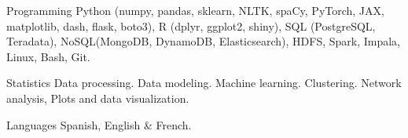 


\begin{cvskills}


\cvskill
{Programming} %
{Python (numpy, pandas, sklearn, NLTK, spaCy, PyTorch, JAX, matplotlib, dash, flask, boto3), R (dplyr, ggplot2, shiny),} %
\cvskill
{}
{SQL (PostgreSQL, Teradata), NoSQL(MongoDB, DynamoDB, Elasticsearch), HDFS, Spark, Impala, Linux, Bash, Git.} %


\cvskill
{Statistics} %
{Data processing. Data modeling. Machine learning. Clustering. Network analysis, Plots and data visualization.} %


\cvskill
{Languages} %
{Spanish, English \& French.} %







\end{cvskills}
